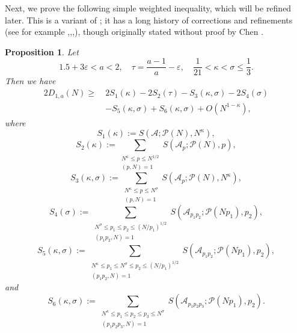 \documentclass[12pt, a4paper]{amsart}
\def\le{\leqslant}
\def\ge{\geqslant}
\theoremstyle{plain}
\newtheorem{proposition}{Proposition}[section]
\theoremstyle{remark}
\numberwithin{equation}{section}
\begin{document}
Next, we prove the following simple weighted inequality, which will be refined later. 
This is a variant of \cite[Lemma 2.1]{Wu08}; it has a long history of corrections and refinements
 (see for example \cite{CaLu02},\cite{Wu04},\cite{Cai08a},\cite{Wu08}), though originally stated without proof by Chen \cite{Chen78}. 
	
\begin{proposition}\label{Goldbachbig}
Let 
$$
1.5+3\varepsilon<a<2,\quad \tau=\dfrac{a-1}{a}-\varepsilon, \quad \frac{1}{21}<\kappa<\sigma\le \frac{1}{3}. 
$$ 
Then we have 
\begin{equation}\label{Goldbachbigw2}
\begin{split}
2D_{1,a}(N)
\ge\ & 2S_1(\kappa)-2S_2(\tau)-S_3(\kappa,\sigma)-2S_4(\sigma)\\
&-S_5(\kappa,\sigma)+S_6(\kappa,\sigma)+O(N^{1-\kappa}),
\end{split}
\end{equation}
where
\[
S_1(\kappa) := S(\mathscr{A}; \mathscr{P}(N), N^\kappa), 
\]
\[
S_2(\kappa) :=\sum\limits_{\substack{N^\kappa\le p\le N^{1/2} \\(p, N)=1}}S(\mathscr{A}_p ; \mathscr{P}(N), p), 
\]
\[
S_3(\kappa, \sigma) := \sum_{\substack{N^\kappa \le p \le N^\sigma \\ (p, N) = 1}} S(\mathscr{A}_p; \mathscr{P}(N), N^\kappa),
\] 
\[
S_4(\sigma) := \sum_{\substack{N^\sigma \le p_1 \le p_2 \le (N/p_1)^{1/2} \\ (p_1 p_2, N) = 1}} S(\mathscr{A}_{p_1 p_2}; \mathscr{P}(N p_1), p_2), 
\]
\[
S_5(\kappa, \sigma) := \sum_{\substack{N^\kappa \le p_1 \le N^\sigma \le p_2 \le (N/p_1)^{1/2} \\ (p_1 p_2, N) = 1}}  S(\mathscr{A}_{p_1 p_2}; \mathscr{P}(N p_1), p_2),
\]
and 
\[
S_6(\kappa, \sigma) := \sum_{\substack{N^\kappa \le p_1 \le p_2 \le p_3 \le N^\sigma \\ (p_1 p_2 p_3, N) = 1}} S(\mathscr{A}_{p_1 p_2 p_3};  \mathscr{P}(N p_1), p_2).
\]
\end{proposition}
	
\end{document}
